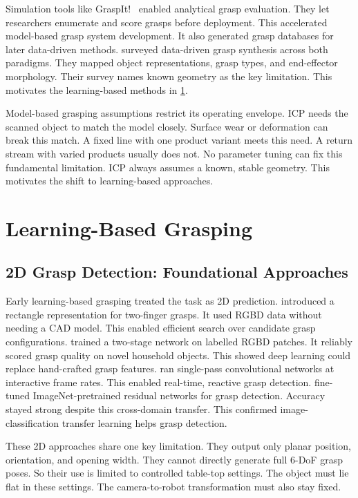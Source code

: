 \documentclass[oneside,studentpaper]{wbk}
\begin{document}
Simulation tools like GraspIt!~\cite{miller2004graspit} enabled analytical grasp evaluation. They let researchers enumerate and score grasps before deployment. This accelerated model-based grasp system development. It also generated grasp databases for later data-driven methods. \cite{bohg2014data} surveyed data-driven grasp synthesis across both paradigms. They mapped object representations, grasp types, and end-effector morphology. Their survey names known geometry as the key limitation. This motivates the learning-based methods in \cref{sec:learning-based-grasping}.

Model-based grasping assumptions restrict its operating envelope. ICP needs the scanned object to match the model closely. Surface wear or deformation can break this match. A fixed line with one product variant meets this need. A return stream with varied products usually does not. No parameter tuning can fix this fundamental limitation. ICP always assumes a known, stable geometry. This motivates the shift to learning-based approaches.

\section{Learning-Based Grasping}
\label{sec:learning-based-grasping}

\subsection{2D Grasp Detection: Foundational Approaches}
\label{sec:2d-grasp-detection}

Early learning-based grasping treated the task as 2D prediction. \cite{jiang2011efficient} introduced a rectangle representation for two-finger grasps. It used RGBD data without needing a CAD model. This enabled efficient search over candidate grasp configurations. \cite{lenz2015deep} trained a two-stage network on labelled RGBD patches. It reliably scored grasp quality on novel household objects. This showed deep learning could replace hand-crafted grasp features. \cite{redmon2015realtime} ran single-pass convolutional networks at interactive frame rates. This enabled real-time, reactive grasp detection. \cite{kumra2017robotic} fine-tuned ImageNet-pretrained residual networks for grasp detection. Accuracy stayed strong despite this cross-domain transfer. This confirmed image-classification transfer learning helps grasp detection.

These 2D approaches share one key limitation. They output only planar position, orientation, and opening width. They cannot directly generate full 6-DoF grasp poses. So their use is limited to controlled table-top settings. The object must lie flat in these settings. The camera-to-robot transformation must also stay fixed.
\end{document}

